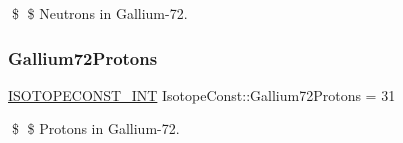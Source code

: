 \$ \$ Neutrons in Gallium-\/72. \mbox{\label{group___isotope_const-_gallium-_ga72_gabc28116753a5817a99d234cd892e06ff}} 
\subsubsection{\texorpdfstring{Gallium72\+Protons}{Gallium72Protons}}
{\footnotesize\ttfamily \mbox{\hyperlink{group___isotope_const-_macros_ga5f18360b3e99483a35c32d789e62621c}{I\+S\+O\+T\+O\+P\+E\+C\+O\+N\+S\+T\+\_\+\+I\+NT}} Isotope\+Const\+::\+Gallium72\+Protons = 31}

\$ \$ Protons in Gallium-\/72. 